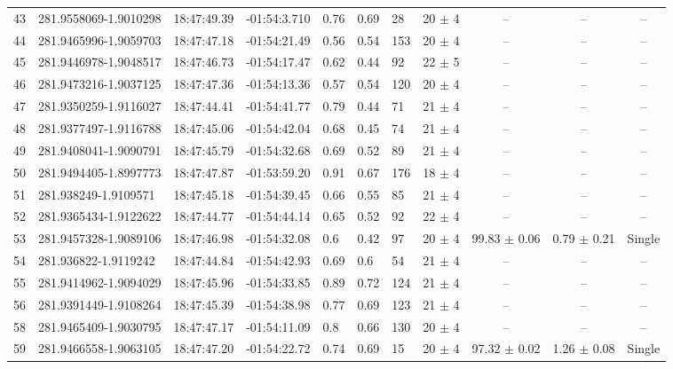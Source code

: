 \begin{table}[htbp!]
\begin{tabular}{llllllllccc}
43  &  281.9558069-1.9010298  &  18:47:49.39  &  -01:54:3.710  &  0.76  &  0.69  &  28  &  20 $\pm$ 4  &  --  &  --  &  -- \\
44  &  281.9465996-1.9059703  &  18:47:47.18  &  -01:54:21.49  &  0.56  &  0.54  &  153  &  20 $\pm$ 4  &  --  &  --  &  -- \\
45  &  281.9446978-1.9048517  &  18:47:46.73  &  -01:54:17.47  &  0.62  &  0.44  &  92  &  22 $\pm$ 5  &  --  &  --  &  -- \\
46  &  281.9473216-1.9037125  &  18:47:47.36  &  -01:54:13.36  &  0.57  &  0.54  &  120  &  20 $\pm$ 4  &  --  &  --  &  -- \\
47  &  281.9350259-1.9116027  &  18:47:44.41  &  -01:54:41.77  &  0.79  &  0.44  &  71  &  21 $\pm$ 4  &  --  &  --  &  -- \\
48  &  281.9377497-1.9116788  &  18:47:45.06  &  -01:54:42.04  &  0.68  &  0.45  &  74  &  21 $\pm$ 4  &  --  &  --  &  -- \\
49  &  281.9408041-1.9090791  &  18:47:45.79  &  -01:54:32.68  &  0.69  &  0.52  &  89  &  21 $\pm$ 4  &  --  &  --  &  -- \\
50  &  281.9494405-1.8997773  &  18:47:47.87  &  -01:53:59.20  &  0.91  &  0.67  &  176  &  18 $\pm$ 4  &  --  &  --  &  -- \\
51  &  281.938249-1.9109571  &  18:47:45.18  &  -01:54:39.45  &  0.66  &  0.55  &  85  &  21 $\pm$ 4  &  --  &  --  &  -- \\
52  &  281.9365434-1.9122622  &  18:47:44.77  &  -01:54:44.14  &  0.65  &  0.52  &  92  &  22 $\pm$ 4  &  --  &  --  &  -- \\
53  &  281.9457328-1.9089106  &  18:47:46.98  &  -01:54:32.08  &  0.6  &  0.42  &  97  &  20 $\pm$ 4  &  99.83 $\pm$ 0.06  &  0.79 $\pm$ 0.21  &  Single \\
54  &  281.936822-1.9119242  &  18:47:44.84  &  -01:54:42.93  &  0.69  &  0.6  &  54  &  21 $\pm$ 4  &  --  &  --  &  -- \\
55  &  281.9414962-1.9094029  &  18:47:45.96  &  -01:54:33.85  &  0.89  &  0.72  &  124  &  21 $\pm$ 4  &  --  &  --  &  -- \\
56  &  281.9391449-1.9108264  &  18:47:45.39  &  -01:54:38.98  &  0.77  &  0.69  &  123  &  21 $\pm$ 4  &  --  &  --  &  -- \\
58  &  281.9465409-1.9030795  &  18:47:47.17  &  -01:54:11.09  &  0.8  &  0.66  &  130  &  20 $\pm$ 4  &  --  &  --  &  -- \\
59  &  281.9466558-1.9063105  &  18:47:47.20  &  -01:54:22.72  &  0.74  &  0.69  &  15  &  20 $\pm$ 4  &  97.32 $\pm$ 0.02  &  1.26 $\pm$ 0.08  &  Single \\

\end{tabular}
\end{table}
